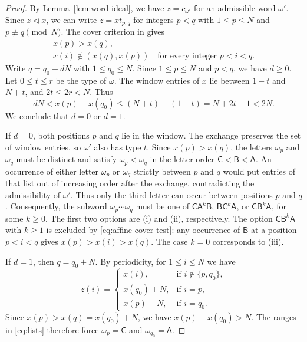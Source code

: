 \documentclass[11pt,a4paper,reqno]{amsart}
\numberwithin{equation}{section}
\theoremstyle{definition}
\theoremstyle{remark}
\theoremstyle{plain}
\newcommand{\A}{\mathsf A}
\newcommand{\B}{\mathsf B}
\newcommand{\CC}{\mathsf C}
\begin{document}
\begin{proof}
By Lemma~\ref{lem:word-ideal}, we have $z=c_{\omega'}$ for an
admissible word $\omega'$.
Since $z\triangleleft x$, we can write $z=xt_{p,q}$ for integers
$p<q$ with $1\leq p\leq N$ and $p\not\equiv q\pmod N$.
The cover criterion in \cite[Lemma~2.2(2)]{LLMS} gives
\begin{equation}\label{eq:affine-cover-test}
 \begin{gathered}
 x(p)>x(q),\\
 x(i)\notin(x(q),x(p))\quad\text{for every integer }p<i<q.
 \end{gathered}
\end{equation}
Write $q=q_0+dN$ with $1\leq q_0\leq N$.
Since $1\leq p\leq N$ and $p<q$, we have $d\geq0$.
Let $0\leq t\leq r$ be the type of $\omega$.
The window entries of $x$ lie between $1-t$ and $N+t$, and
$2t\leq2r<N$. Thus
\begin{equation}
 dN<x(p)-x(q_0)\leq(N+t)-(1-t)=N+2t-1<2N.
\end{equation}
We conclude that $d=0$ or $d=1$.

If $d=0$, both positions $p$ and $q$ lie in the window.
The exchange preserves the set of window entries, so $\omega'$ also has type $t$.
Since $x(p)>x(q)$, the letters $\omega_p$ and $\omega_q$ must be
distinct and satisfy $\omega_p<\omega_q$ in the letter order
$\CC<\B<\A$.
An occurrence of either letter $\omega_p$ or $\omega_q$ strictly
between $p$ and $q$ would put entries of that list out of increasing
order after the exchange, contradicting the admissibility of
$\omega'$. Thus only the third letter can occur between positions
$p$ and $q$.
Consequently, the subword $\omega_p\cdots\omega_q$ must be one of
$\CC\A^k\B$, $\B\CC^k\A$, or $\CC\B^k\A$, for some $k\geq0$.
The first two options are \textup{(i)} and \textup{(ii)}, respectively.
The option $\CC\B^k\A$ with $k\geq1$ is excluded by
\eqref{eq:affine-cover-test}: any occurrence of $\B$ at a position
$p<i<q$ gives $x(p)>x(i)>x(q)$.
The case $k=0$ corresponds to \textup{(iii)}.

If $d=1$, then $q=q_0+N$. By periodicity, for $1\leq i\leq N$ we have
\begin{equation}\label{eq:cover-shifted-window}
 z(i)=
 \begin{cases}
 x(i),&\text{if }i\notin\{p,q_0\},\\
 x(q_0)+N,&\text{if }i=p,\\
 x(p)-N,&\text{if }i=q_0.
 \end{cases}
\end{equation}
Since $x(p)>x(q)=x(q_0)+N$, we have $x(p)-x(q_0)>N$.
The ranges in \eqref{eq:lists} therefore force
$\omega_p=\CC$ and $\omega_{q_0}=\A$.


\end{proof}
\end{document}
